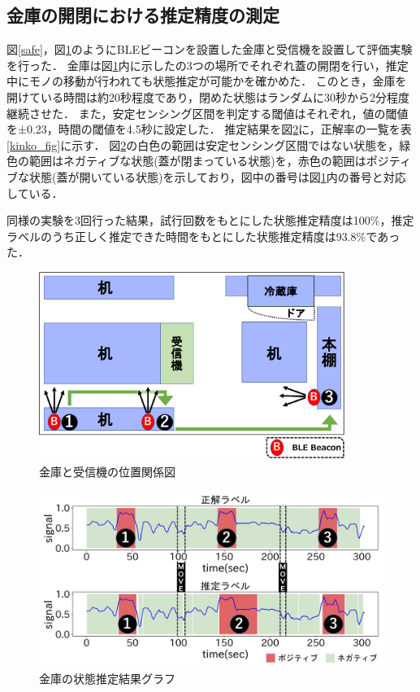 \subsection{金庫の開閉における推定精度の測定}
図\ref{safe}，図\ref{kinko_position}のようにBLEビーコンを設置した金庫と受信機を設置して評価実験を行った．
金庫は図\ref{kinko_position}内に示したの3つの場所でそれぞれ蓋の開閉を行い，推定中にモノの移動が行われても状態推定が可能かを確かめた．
このとき，金庫を開けている時間は約20秒程度であり，閉めた状態はランダムに30秒から2分程度継続させた．
また，安定センシング区間を判定する閾値はそれぞれ，値の閾値を±0.23，時間の閾値を4.5秒に設定した．
推定結果を図\ref{kinko_graph}に，正解率の一覧を表\ref{kinko_fig}に示す．
図\ref{kinko_graph}の白色の範囲は安定センシング区間ではない状態を，緑色の範囲はネガティブな状態(蓋が閉まっている状態)を，赤色の範囲はポジティブな状態(蓋が開いている状態)を示しており，図中の番号は図\ref{kinko_position}内の番号と対応している．

同様の実験を3回行った結果，試行回数をもとにした状態推定精度は100\%，推定ラベルのうち正しく推定できた時間をもとにした状態推定精度は93.8\%であった．

\begin{figure}[tbh]
    \centering
    \includegraphics[width=10cm]{images/chapter3/kinko_position_fig.pdf}
    \caption{金庫と受信機の位置関係図}
    \label{kinko_position}
\end{figure}

\begin{figure}[tbh]
    \centering
    \includegraphics[width=14cm]{images/chapter3/kinko_graph.jpg}
    \caption{金庫の状態推定結果グラフ}
    \label{kinko_graph}
\end{figure}

